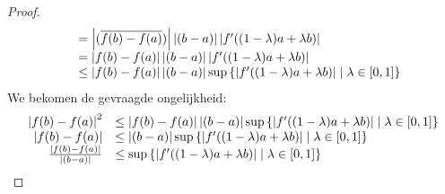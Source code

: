 \documentclass[main.tex]{subfiles}
\begin{document}
\begin{bpr}
\begin{proof}
\[\begin{array}{rl}
      &= \left| (\overline{f(b)-f(a)})\right|\left|(b-a) \right|\left|f'((1-\lambda)a+\lambda b)\right|\\
      &= \left| f(b)-f(a) \right|\left|(b-a) \right|\left|f'((1-\lambda)a+\lambda b)\right|\\
      &\le \left| f(b)-f(a) \right|\left|(b-a) \right|\sup\left\{ \left|f'((1-\lambda)a+\lambda b) \right| \mid \lambda \in \interval{0}{1} \right\}\\
    \end{array}
    \]
    We bekomen de gevraagde ongelijkheid:
    \[
    \begin{array}{rl}
      \left| f(b)-f(a) \right|^{2}
      &\le \left| f(b)-f(a) \right|\left|(b-a) \right|\sup\left\{ \left|f'((1-\lambda)a+\lambda b) \right| \mid \lambda \in \interval{0}{1} \right\}\\
      \left| f(b)-f(a) \right|
      &\le \left|(b-a) \right|\sup\left\{ \left|f'((1-\lambda)a+\lambda b) \right| \mid \lambda \in \interval{0}{1} \right\}\\
      \frac{\left| f(b)-f(a) \right|}{\left|(b-a) \right|}
      &\le \sup\left\{ \left|f'((1-\lambda)a+\lambda b) \right| \mid \lambda \in \interval{0}{1} \right\}\\
    \end{array}
    \]
  \end{proof}
\end{bpr}

\end{document}
